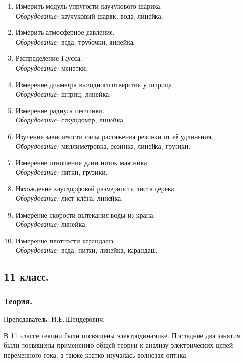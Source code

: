 \documentclass[12pt,a4paper,oneside,draft]{scrartcl}
\newlength{\h}
\newlength{\x}
\begin{document}
\begin{enumerate}
\item Измерить модуль упругости каучукового шарика. \\
  \textit{Оборудование:} каучуковый шарик, вода, линейка.
\item Измерить атмосферное давление. \\ \textit{Оборудование:} вода, трубочки, линейка.
\item Распределение Гаусса. \\ \textit{Оборудование:} монетки.
\item Измерение диаметра выходного отверстия у шприца. \\
  \textit{Оборудование:} шприц, линейка.
\item Измерение радиуса песчинки. \\ \textit{Оборудование:}
  секундомер, линейка.
\item Изучение зависимости силы растяжения резинки от её удлинения. \\
  \textit{Оборудование:} миллиметровка, резинка, линейка, грузики.
\item Измерение отношения длин ниток маятника. \\ \textit{Оборудование:} нитки,
  грузики.
\item Нахождение хаусдорфовой размерности листа дерева. \\
  \textit{Оборудование:} лист клёна, линейка.
\item Измерение скорости вытекания воды из крана. \\
  \textit{Оборудование:} линейка.
\item Измерение плотности карандаша. \\ \textit{Оборудование:} вода,
  нитки, линейка, карандаш. 
\end{enumerate}

\subsection{11 класс.}
\label{sec:daily_11}

\subsubsection{Теория.}
\label{sec:daily_11_th}

\textsf{Преподаватель: И.Е.\,Шендерович.}
\smallskip

В 11 классе лекции были посвящены электродинамике. Последние два
занятия были посвящены применению общей теории к анализу электрических
цепей переменного тока, а также кратко изучалась волновая оптика. 
\end{document}
